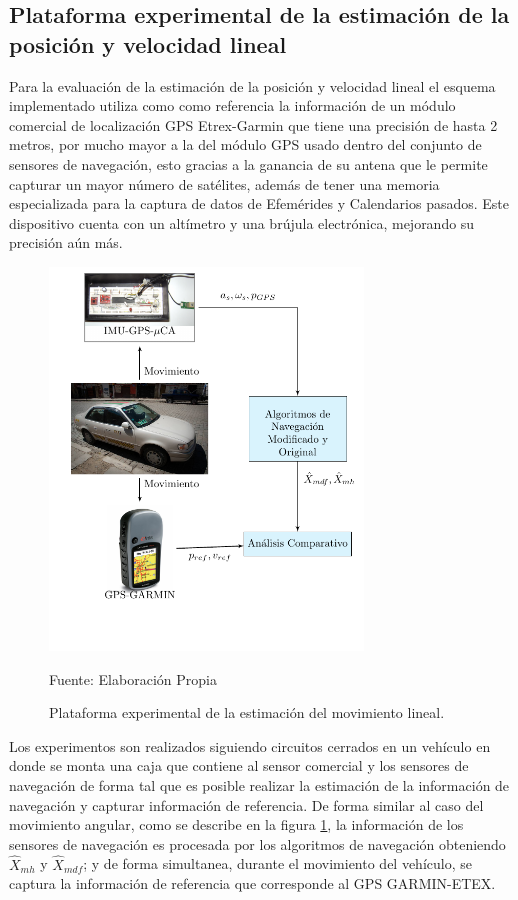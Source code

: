 \documentclass[conference]{IEEEtran}
\begin{document}
\subsection{Plataforma experimental de la estimación de la posición y velocidad lineal}
Para la evaluación de la estimación de la posición y velocidad lineal el esquema implementado utiliza como como referencia la información de un módulo comercial de localización GPS Etrex-Garmin que tiene una precisión de hasta 2 metros, por mucho mayor a la del módulo GPS usado dentro del conjunto de sensores de navegación, esto gracias a la ganancia de su antena que le permite capturar un mayor número de satélites, además de tener una memoria especializada para la captura de datos de Efemérides y Calendarios pasados. Este dispositivo cuenta con un altímetro y una brújula electrónica, mejorando su precisión aún más.\par%
\begin{figure}
\centering
\includegraphics[width=22.5em]{plataforma_fig14.pdf}
\caption{Plataforma experimental de la estimación del movimiento lineal.}
\scriptsize{Fuente: Elaboración Propia}
\label{plataforma_fig9}
\end{figure}
Los experimentos son realizados siguiendo circuitos cerrados en un vehículo en donde se monta una caja que contiene al sensor comercial y los sensores de navegación de forma tal que es posible realizar la estimación de la información de navegación y capturar información de referencia. De forma similar al caso del movimiento angular, como se describe en la figura \ref{plataforma_fig9}, la información de los sensores de navegación es procesada por los algoritmos de navegación obteniendo $\hat{X}_{mh}$ y $\hat{X}_{mdf}$; y de forma simultanea, durante el movimiento del vehículo, se captura la información de referencia que corresponde al GPS GARMIN-ETEX.
\end{document}
